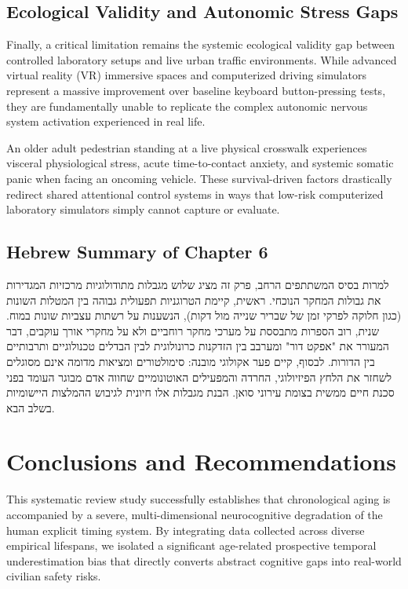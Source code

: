 \documentclass{custom_report}
\begin{document}
\section{Ecological Validity and Autonomic Stress Gaps}
Finally, a critical limitation remains the systemic ecological validity gap between controlled laboratory setups and live urban traffic environments. While advanced virtual reality (VR) immersive spaces and computerized driving simulators represent a massive improvement over baseline keyboard button-pressing tests, they are fundamentally unable to replicate the complex autonomic nervous system activation experienced in real life. 

An older adult pedestrian standing at a live physical crosswalk experiences visceral physiological stress, acute time-to-contact anxiety, and systemic somatic panic when facing an oncoming vehicle. These survival-driven factors drastically redirect shared attentional control systems in ways that low-risk computerized laboratory simulators simply cannot capture or evaluate.

\section{Hebrew Summary of Chapter 6}
למרות בסיס המשתתפים הרחב, פרק זה מציג שלוש מגבלות מתודולוגיות מרכזיות המגדירות את גבולות המחקר הנוכחי. ראשית, קיימת הטרוגניות תפעולית גבוהה בין המטלות השונות (כגון חלוקה לפרקי זמן של שבריר שנייה מול דקות), הנשענות על רשתות עצביות שונות במוח. שנית, רוב הספרות מתבססת על מערכי מחקר רוחביים ולא על מחקרי אורך עוקבים, דבר המעורר את "אפקט דור" ומערבב בין הזדקנות כרונולוגית לבין הבדלים טכנולוגיים ותרבותיים בין הדורות. לבסוף, קיים פער אקולוגי מובנה: סימולטורים ומציאות מדומה אינם מסוגלים לשחזר את הלחץ הפיזיולוגי, החרדה והמפעילים האוטונומיים שחווה אדם מבוגר העומד בפני סכנת חיים ממשית בצומת עירוני סואן. הבנת מגבלות אלו חיונית לגיבוש ההמלצות היישומיות בשלב הבא.

\newpage

\chapter{Conclusions and Recommendations}
\label{ch:conclusions}

This systematic review study successfully establishes that chronological aging is accompanied by a severe, multi-dimensional neurocognitive degradation of the human explicit timing system. By integrating data collected across diverse empirical lifespans, we isolated a significant age-related prospective temporal underestimation bias that directly converts abstract cognitive gaps into real-world civilian safety risks.
\end{document}

